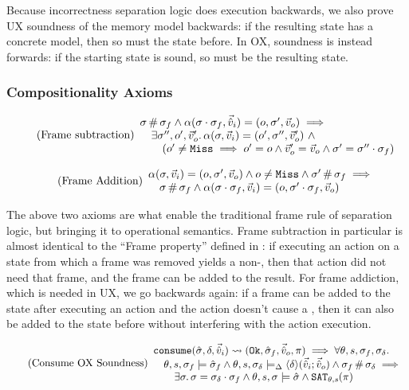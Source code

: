 Because incorrectness separation logic does execution backwards, we also prove UX soundness of the memory model backwards: if the resulting state has a concrete model, then so must the state before. In OX, soundness is instead forwards: if the starting state is sound, so must be the resulting state.

\subsubsection{Compositionality Axioms}

\begin{equation}
\tag{Frame subtraction}\label{eq:frame-sub}
\begin{array}{l}
\sigma\operatorname{\#}\sigma_f \land \alpha(\sigma\cdot\sigma_f,\vec{\hat{v}}_i)=(o, \sigma',\vec{v}_o) \implies \\
\quad\exists \sigma'', o', \vec{v}_o'\ldotp \alpha(\sigma,\vec{v}_i)=(o', \sigma'', \vec{v}_o') ~\land \\
\qquad(o' \neq \texttt{Miss} \implies o' = o \land  \vec{v}_o' = \vec{v}_o \land \sigma' = \sigma'' \cdot \sigma_f)
\end{array}
\end{equation}

\begin{equation}
\tag{Frame Addition}\label{eq:frame-add}
\begin{array}{l}
\alpha(\sigma,\vec{v}_i)=(o, \sigma', \vec{v}_o) \land o \neq \texttt{Miss} \land \sigma'\operatorname{\#}\sigma_f\implies\\
\quad\sigma \operatorname{\#} \sigma_f \land \alpha(\sigma\cdot\sigma_f, \vec{v}_i)=(o, \sigma'\cdot\sigma_f, \vec{v}_o)
\end{array}
\end{equation}

The above two axioms are what enable the traditional frame rule of separation logic, but bringing it to operational semantics. Frame subtraction in particular is almost identical to the ``Frame property'' defined in \cite{localreasoning}: if executing an action on a state from which a frame was removed yields a non-\Miss, then that action did not need that frame, and the frame can be added to the result. For frame addiction, which is needed in UX, we go backwards again: if a frame can be added to the state after executing an action and the action doesn't cause a \Miss, then it can also be added to the state before without interfering with the action execution.

\begin{equation}
\tag{Consume OX Soundness}\label{eq:consume-ox-sound}
\begin{array}{l}
\texttt{consume}(\hat{\sigma},\delta,\vec{\hat{v}}_i)\rightsquigarrow (\texttt{Ok},\hat{\sigma}_f,\vec{\hat{v}}_o,\pi) \implies \forall \theta,s,\sigma_f,\sigma_\delta\ldotp \\
\quad \theta,s,\sigma_f\models \hat{\sigma}_f \land \theta, s, \sigma_\delta \models_{\Delta} \left<\delta\right>\!(\vec{\hat{v}}_i;\vec{\hat{v}}_o) \land \sigma_f\operatorname{\#}\sigma_\delta \implies \\
\qquad \exists \sigma\ldotp \sigma = \sigma_\delta \cdot \sigma_f \land \theta,s,\sigma\models \hat{\sigma} \land \texttt{SAT}_{\mathit{\theta,s}}(\pi)
\end{array}
\end{equation}

